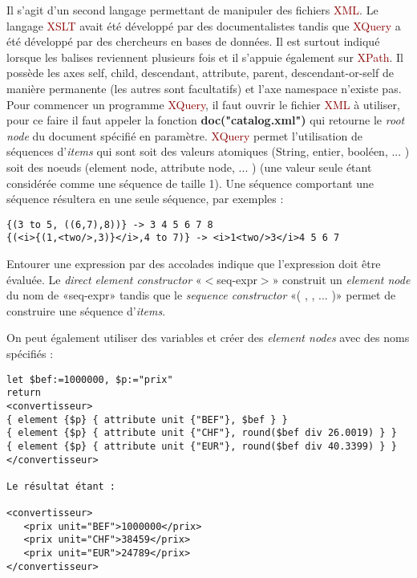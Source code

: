\documentclass{article}
\newcommand{\red}[1]{\textcolor{darkred}{#1}}
\begin{document}
Il s'agit d'un second langage permettant de manipuler des fichiers \red{XML}. Le langage \red{XSLT} avait été développé par des documentalistes tandis que \red{XQuery} a été 
développé par des chercheurs en bases de données. Il est surtout indiqué lorsque les balises reviennent plusieurs fois et il s'appuie également sur \red{XPath}. Il possède les axes 
self, child, descendant, attribute, parent, descendant-or-self de manière permanente (les autres sont facultatifs) et l'axe namespace n'existe pas. Pour commencer un 
programme \red{XQuery}, il faut ouvrir le fichier \red{XML} à utiliser, pour ce faire il faut appeler la fonction \textbf{doc("catalog.xml")} qui retourne le \textit{root node} du 
document spécifié en paramètre. \red{XQuery} permet l'utilisation de séquences d'\textit{items} qui sont soit des valeurs atomiques (String, entier, booléen, ... ) soit des noeuds 
(element node, attribute node, ... ) (une valeur seule étant considérée comme une séquence de taille 1). Une séquence comportant une séquence résultera en une seule séquence, par 
exemples :  \begin{verbatim}
{(3 to 5, ((6,7),8))} -> 3 4 5 6 7 8
{(<i>{(1,<two/>,3)}</i>,4 to 7)} -> <i>1<two/>3</i>4 5 6 7
\end{verbatim}
Entourer une expression par des accolades indique que l'expression doit être évaluée. Le \textit{direct element constructor} «$<$seq-expr$>$» construit un \textit{element node} du 
nom de «seq-expr» tandis que le \textit{sequence constructor} «( , ,  ... )» permet de construire une séquence d'\textit{items}. 

\newpage

On peut également utiliser des variables et créer des \textit{element nodes} avec des noms spécifiés : 
\begin{verbatim}
let $bef:=1000000, $p:="prix"
return
<convertisseur>
{ element {$p} { attribute unit {"BEF"}, $bef } }
{ element {$p} { attribute unit {"CHF"}, round($bef div 26.0019) } }
{ element {$p} { attribute unit {"EUR"}, round($bef div 40.3399) } }
</convertisseur>

Le résultat étant : 

<convertisseur>
   <prix unit="BEF">1000000</prix>
   <prix unit="CHF">38459</prix>
   <prix unit="EUR">24789</prix>
</convertisseur>

\end{verbatim}
\end{document}
